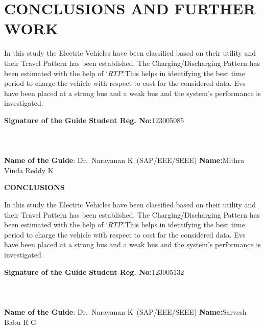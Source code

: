 	\chapter{CONCLUSIONS AND FURTHER WORK}
	\label{chap:conclusion}
	
	
	In this study the Electric Vehicles have been classified based on their utility and their Travel Pattern has been established.  The Charging/Discharging Pattern has been estimated with the help of `$RTP$'.This helps in identifying the best time period to charge the vehicle with respect to cost for the considered data. Evs have been placed at a strong bus and a weak bus and the system's performance is investigated.
	
	
	\vspace*{24pt}
	
	\noindent \textbf{Signature of the Guide} \hspace*{69mm} \textbf{Student Reg. No:}123005085\\
		\\
	\\
	\\
\noindent \textbf{Name of the Guide}:{ Dr.~Narayanan K}~(SAP/EEE/SEEE) \hspace*{7mm} \textbf{Name:}Mithra Vinda Reddy K
\pagebreak
	\pagebreak
	

	\begin{center}
		\Large{{\textbf{CONCLUSIONS}}}
	\end{center}
	In this study the Electric Vehicles have been classified based on their utility and their Travel Pattern has been established.  The Charging/Discharging Pattern has been estimated with the help of `$RTP$'.This helps in identifying the best time period to charge the vehicle with respect to cost for the considered data. Evs have been placed at a strong bus and a weak bus and the system's performance is investigated.
	
	
	\vspace*{24pt}
	
	\noindent \textbf{Signature of the Guide} \hspace*{66mm} \textbf{Student Reg. No:}123005132\\
		\\
	\\
	\\
\noindent \textbf{Name of the Guide}:{ Dr.~Narayanan K}~(SAP/EEE/SEEE) \hspace*{10 mm} \textbf{Name:}Sarvesh Babu R G
\pagebreak
	\pagebreak
	
